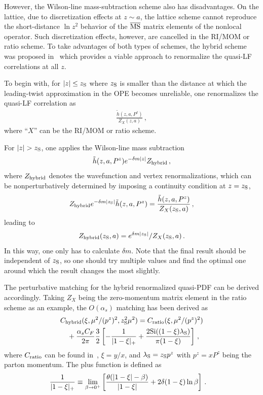 \documentclass[aps,rmp,reprint,amsmath,amssymb,graphicx,longbibliography]{revtex4-1} %
\newcommand{\MS}{{\overline{\rm MS}}}
\newcommand{\nn}{\nonumber}
\begin{document}
However, the Wilson-line mass-subtraction scheme also has disadvantages. On the lattice, due to discretization effects at $z\sim a$, the lattice scheme cannot reproduce the short-distance $\ln z^2$ behavior of the $\MS$ matrix elements of the nonlocal operator. Such discretization effects, however, are cancelled in the RI/MOM or ratio scheme. To take advantages of both types of schemes, the hybrid scheme was proposed in~\cite{Ji:2020brr} which provides a viable approach to renormalize the quasi-LF correlations at all $z$.


To begin with,
for $|z|\le z_{\rm S}$ where $z_{\rm S}$ is smaller than the distance at which the leading-twist approximation in the OPE becomes unreliable, one renormalizes the quasi-LF correlation as
\begin{align}\label{eq:ratio2}
	\frac{\tilde h(z,a,P^z)}{Z_X(z,a)}\,,
\end{align}
where ``$X$'' can be the RI/MOM or ratio scheme.

For $|z|>z_{\rm S}$, one applies the Wilson-line mass subtraction
\begin{align}
	{\tilde h(z,a,P^z)}e^{-\delta m |z|}Z_{\rm hybrid}\,,
\end{align}
where $Z_{\rm hybrid}$ denotes the wavefunction and vertex renormalizations, which can be nonperturbatively determined by imposing a continuity condition at $z=z_{\rm S}$,
\begin{align}
	Z_{\rm hybrid} e^{-\delta m |z_{\rm S}|}{\tilde h(z,a,P^z)}  = \frac{{\tilde h(z,a,P^z)}}{Z_X(z_{\rm S},a) }\,,
\end{align}
leading to
\begin{align}
	Z_{\rm hybrid}(z_{\rm S},a) = e^{\delta m |z_{\rm S}|}/{Z_X(z_{\rm S},a)  }\,.
\end{align}
In this way, one only has to calculate $\delta m$. Note that the final result should be independent of $z_{\rm S}$, so one should try multiple values and find the optimal one around which the result changes the most slightly.

The perturbative matching for the hybrid renormalized quasi-PDF can be derived accordingly. Taking $Z_X$ being the zero-momentum matrix element in the ratio scheme as an example, the $O(\alpha_s)$ matching has been derived as~\cite{Ji:2020brr}
\begin{align}\label{eq:hybridm2}
	&C_{\rm hybrid}(\xi, \mu^2/(p^z)^2, z_{\rm S}^2\mu^2) = C_{\rm ratio}(\xi, \mu^2/(p^z)^2) \nn\\
	&\quad+{\alpha_sC_F\over 2\pi}{3\over 2} \left[-{1\over |1-\xi|_+}+ \frac{2 \text{Si}((1-\xi) \lambda_{\rm S})}{\pi  (1-\xi)} \right]\,,
\end{align}
where $C_{\rm ratio}$ can be found in~\cite{Izubuchi:2018srq}, $\xi=y/x$, and $\lambda_{\rm S}=z_{\rm S}p^z$ with $p^z=xP^z$ being the parton momentum. The plus function is defined as
\begin{align}
	{1\over |1-\xi|_+} &\equiv \lim_{\beta\to0^+}\left[ {\theta(|1-\xi|-\beta)\over |1-\xi|} + 2\delta(1-\xi)\ln\beta\right] \,.
\end{align}
\end{document}
